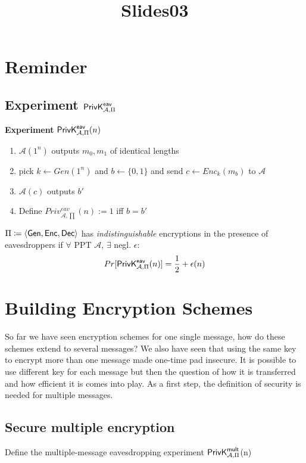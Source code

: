 \documentclass[12pt]{article}
\title{Slides03}
\begin{document}
\maketitle
\tableofcontents
\newpage
\section{Reminder}
\subsection{ Experiment $\mathsf{PrivK}_{\mathcal{A},\Pi}^\mathsf{eav}$}
\textbf{Experiment} $\mathsf{PrivK}_{\mathcal{A},\Pi}^\mathsf{eav}(n)$
\begin{enumerate}
\item $\mathcal{A}(1^n)$ outputs $m_0,m_1$ of identical lengths
\item pick $k \leftarrow Gen(1^n)$ and  $b \leftarrow \{0,1\}$ and send $c \leftarrow Enc_k(m_b)$ to $\mathcal{A}$
 \item $\mathcal{A}(c)$ outputs $b'$
 \item Define $Priv_{\mathcal{A},\prod}^{eav}(n):=1$ iff $b=b'$
\end{enumerate}
$\Pi \coloneqq \langle \operatorname{\mathsf{Gen}}, \operatorname{\mathsf{Enc}}, \operatorname{\mathsf{Dec}} \rangle $ has \emph{indistinguishable} encryptions in the presence of eavesdroppers if $\forall$ PPT $\mathcal{A}$, $\exists$ negl. $\epsilon$:
\begin{equation*}
Pr[\mathsf{PrivK}_{\mathcal{A},\Pi}^\mathsf{eav}(n)] = \frac{1}{2} + \epsilon(n)
\end{equation*}

\section{Building Encryption Schemes}
So far we have seen encryption schemes for one single message, how do these schemes extend to several messages? We also have seen that using the same key to encrypt more than one message made one-time pad insecure. It is possible to use different key for each message but then the question of how it is transferred and how efficient it is comes into play. As a first step, the definition of security is needed for multiple messages.\\
\subsection{Secure multiple encryption}
Define the multiple-message eavesdropping experiment $\mathsf{PrivK}_{\mathcal{A},\Pi}^\mathsf{mult}$(n)
\end{document}
